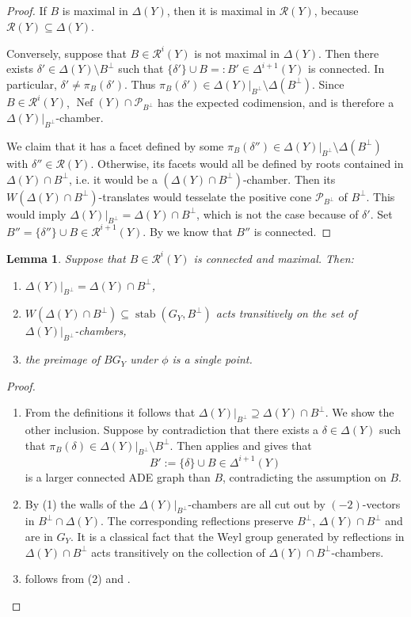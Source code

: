 \documentclass[a4paper]{amsart}
\theoremstyle{definition}
\theoremstyle{plain}
\newtheorem{lemma}[definition]{Lemma}
\DeclareMathOperator{\Nef}{Nef}
\DeclareMathOperator{\stab}{stab}
\renewcommand{\P}{\mathcal{P}}
\newcommand{\R}{\mathcal{R}}
\begin{document}
\begin{proof}
If $B$ is maximal in $\Delta(Y)$, then it is maximal in $\R(Y)$, because $\R(Y) \subseteq \Delta(Y)$.

Conversely, suppose that $B \in \R^{i}(Y)$ is not maximal in $\Delta(Y)$.
Then there exists $\delta' \in \Delta(Y)\setminus B^\perp$ such that $\{\delta'\} \cup B =:B' \in \Delta^{i+1}(Y)$ is connected. In particular, $\delta' \neq \pi_B(\delta')$. Thus $\pi_B(\delta') \in \Delta(Y)|_{B^\perp} \setminus \Delta(B^\perp)$.
Since $B \in \R^i(Y)$, $\Nef(Y) \cap \P_{B^\perp}$ has the expected codimension, and is therefore a $\Delta(Y)|_{B^\perp}$-chamber. 

We  claim that it has a facet defined by some $\pi_B(\delta'') \in \Delta(Y)|_{B^\perp} \setminus \Delta(B^\perp)$ with $\delta'' \in \R(Y)$. Otherwise, its facets would all be defined by roots contained in $\Delta(Y)\cap B^\perp$, i.e.
it would be a $(\Delta(Y) \cap B^\perp)$-chamber.
Then its $W(\Delta(Y)\cap B^\perp)$-translates would tesselate the positive cone $\P_{B^\perp}$ of $B^{\perp}$. This would imply $\Delta(Y)|_{B^\perp} = \Delta(Y)\cap B^\perp$, which is not the case because of $\delta'$.
Set $B'' = \{\delta''\}\cup B \in \R^{i+1}(Y)$. By  we know that $B''$ is connected.
\end{proof}
\begin{lemma}\label{lem:transitive_on_induced_chambers}
Suppose that $B \in \R^i(Y)$ is connected and maximal. Then:
\begin{enumerate}
\item $\Delta(Y)|_{B^\perp} = \Delta(Y) \cap B^\perp$,
\item $W(\Delta(Y)\cap B^\perp) \subseteq \stab(G_Y,B^\perp)$ acts transitively on the set of $\Delta(Y)|_{B^\perp}$-chambers,
\item the preimage of $B G_Y$ under $\phi$ is a single point.
\end{enumerate}
\end{lemma}
\begin{proof}
\begin{enumerate}
\item From the definitions it follows that $\Delta(Y)|_{B^\perp} \supseteq \Delta(Y) \cap B^\perp$. We show the other inclusion.
Suppose by contradiction that there exists a $\delta \in \Delta(Y)$ such that $\pi_B(\delta) \in \Delta(Y)|_{B^\perp} \setminus B^\perp$. Then  applies and gives that 
\[B':=\{\delta\}\cup B \in \Delta^{i+1}(Y)\]
is a larger connected ADE graph than $B$, contradicting the assumption on $B$.

\item By (1) the walls of the $\Delta(Y)|_{B^\perp}$-chambers are all cut out by $(-2)$-vectors in $B^\perp \cap \Delta(Y)$. The corresponding reflections preserve $B^\perp$, $\Delta(Y) \cap B^\perp$ and are in $G_Y$. It is a classical fact that the Weyl group generated by reflections in $\Delta(Y) \cap B^\perp$ acts transitively on the collection of $\Delta(Y) \cap B^\perp$-chambers.

\item follows from (2) and .
\end{enumerate}
\end{proof}
\end{document}
